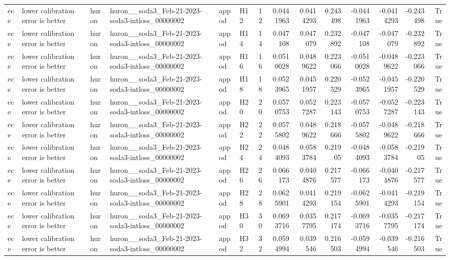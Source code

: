 \begin{longtable}{llllllrrrrrrrr}
ece & lower calibration error is better & huron & huron\_\_soda3\_Feb-21-2023-soda3-intloss\_00000002 & appod & H12 & 12 & 0.0441963 & 0.0414293 & 0.243498 & -0.0441963 & -0.0414293 & -0.243498 & True \\
ece & lower calibration error is better & huron & huron\_\_soda3\_Feb-21-2023-soda3-intloss\_00000002 & appod & H14 & 14 & 0.047108 & 0.047079 & 0.232892 & -0.047108 & -0.047079 & -0.232892 & True \\
ece & lower calibration error is better & huron & huron\_\_soda3\_Feb-21-2023-soda3-intloss\_00000002 & appod & H16 & 16 & 0.0510028 & 0.0489622 & 0.223066 & -0.0510028 & -0.0489622 & -0.223066 & True \\
ece & lower calibration error is better & huron & huron\_\_soda3\_Feb-21-2023-soda3-intloss\_00000002 & appod & H18 & 18 & 0.0523965 & 0.0451957 & 0.220529 & -0.0523965 & -0.0451957 & -0.220529 & True \\
ece & lower calibration error is better & huron & huron\_\_soda3\_Feb-21-2023-soda3-intloss\_00000002 & appod & H20 & 20 & 0.0570753 & 0.0527287 & 0.223143 & -0.0570753 & -0.0527287 & -0.223143 & True \\
ece & lower calibration error is better & huron & huron\_\_soda3\_Feb-21-2023-soda3-intloss\_00000002 & appod & H22 & 22 & 0.0575802 & 0.0489622 & 0.218666 & -0.0575802 & -0.0489622 & -0.218666 & True \\
ece & lower calibration error is better & huron & huron\_\_soda3\_Feb-21-2023-soda3-intloss\_00000002 & appod & H24 & 24 & 0.0484093 & 0.0583784 & 0.21905 & -0.0484093 & -0.0583784 & -0.21905 & True \\
ece & lower calibration error is better & huron & huron\_\_soda3\_Feb-21-2023-soda3-intloss\_00000002 & appod & H26 & 26 & 0.066173 & 0.0404876 & 0.217577 & -0.066173 & -0.0404876 & -0.217577 & True \\
ece & lower calibration error is better & huron & huron\_\_soda3\_Feb-21-2023-soda3-intloss\_00000002 & appod & H28 & 28 & 0.0625901 & 0.0414293 & 0.219154 & -0.0625901 & -0.0414293 & -0.219154 & True \\
ece & lower calibration error is better & huron & huron\_\_soda3\_Feb-21-2023-soda3-intloss\_00000002 & appod & H30 & 30 & 0.0693716 & 0.0357795 & 0.217174 & -0.0693716 & -0.0357795 & -0.217174 & True \\
ece & lower calibration error is better & huron & huron\_\_soda3\_Feb-21-2023-soda3-intloss\_00000002 & appod & H32 & 32 & 0.0594994 & 0.039546 & 0.216503 & -0.0594994 & -0.039546 & -0.216503 & True \\

\end{longtable}
